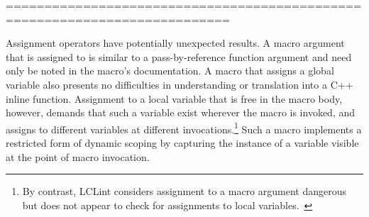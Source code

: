 ===========================================================================

Assignment operators have potentially unexpected results.  A macro argument
that is assigned to is similar to a pass-by-reference function argument and
need only be noted in the macro's documentation.  A macro that assigns a
global variable also presents no difficulties in understanding or
translation into a C++ inline function.  Assignment to a local variable
that is free in the macro body, however, demands that such a variable exist
wherever the macro is invoked, and assigns to different variables at
different invocations.\footnote{By contrast, LCLint considers assignment to
  a macro argument dangerous but does not appear to check for assignments
  to local variables.~\cite{Evans:LCLint}} Such a macro implements a
restricted form of dynamic scoping by capturing the instance of a variable
visible at the point of macro invocation.

